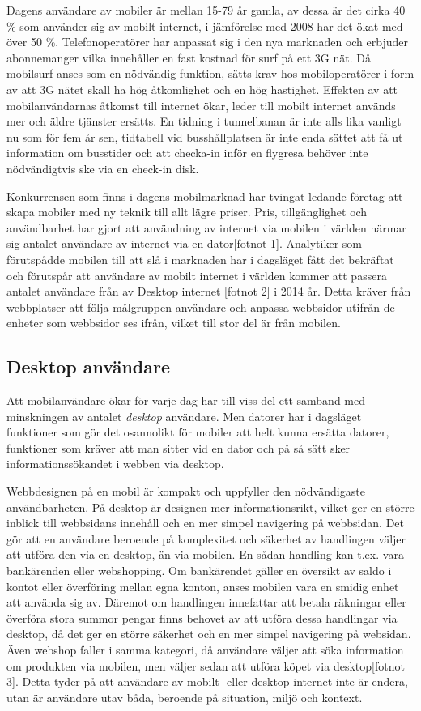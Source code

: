 \documentclass[11pt]{article}
\begin{document}
Dagens användare av mobiler är mellan 15-79 år gamla, av dessa är det cirka 40 \% som använder sig av mobilt internet, i jämförelse med 2008 har det ökat med över 50 \%. Telefonoperatörer har anpassat sig i den nya marknaden och erbjuder abonnemanger vilka innehåller en fast kostnad för surf på ett 3G nät. Då mobilsurf anses som en nödvändig funktion, sätts krav hos mobiloperatörer i form av att 3G nätet skall ha hög åtkomlighet och en hög hastighet. Effekten av att mobilanvändarnas åtkomst till internet ökar, leder till mobilt internet används mer och äldre tjänster ersätts. En tidning i tunnelbanan är inte alls lika vanligt nu som för fem år sen, tidtabell vid busshållplatsen är inte enda sättet att få ut information om busstider och att checka-in inför en flygresa behöver inte nödvändigtvis ske via en check-in disk.


Konkurrensen som finns i dagens mobilmarknad har tvingat ledande företag att skapa mobiler med ny teknik till allt lägre priser. Pris, tillgänglighet och användbarhet har gjort att användning av internet via mobilen i världen närmar sig antalet användare av internet via en dator[fotnot 1]. Analytiker som förutspådde mobilen till att slå i marknaden har i dagsläget fått det bekräftat och förutspår att användare av mobilt internet i världen kommer att passera antalet användare från av Desktop internet [fotnot 2] i 2014 år. Detta kräver från webbplatser att följa målgruppen användare och anpassa webbsidor utifrån de enheter som webbsidor ses ifrån, vilket till stor del är från mobilen.

\subsection{Desktop användare}
Att mobilanvändare ökar för varje dag har till viss del ett samband med minskningen av antalet \textit{desktop} användare. Men datorer har i dagsläget funktioner som gör det osannolikt för mobiler att helt kunna ersätta datorer, funktioner som kräver att man sitter vid en dator och på så sätt sker informationssökandet i webben via desktop. 

Webbdesignen på en mobil är kompakt och uppfyller den nödvändigaste användbarheten.
På desktop är designen mer informationsrikt, vilket ger en större inblick till webbsidans innehåll och en mer simpel navigering på webbsidan. Det gör att en användare beroende på komplexitet och säkerhet av handlingen väljer att utföra den via en desktop, än via mobilen. En sådan handling kan t.ex. vara bankärenden eller webshopping. Om bankärendet gäller en översikt av saldo i kontot eller överföring mellan egna konton, anses mobilen vara en smidig enhet att använda sig av. Däremot om handlingen innefattar att betala räkningar eller överföra stora summor pengar finns behovet av att utföra dessa handlingar via desktop, då det ger en större säkerhet och en mer simpel navigering på websidan. Även webshop faller i samma kategori, då användare väljer att söka information om produkten via mobilen, men väljer sedan att utföra köpet via desktop[fotnot 3]. Detta tyder på att användare av mobilt- eller desktop internet inte är endera, utan är användare utav båda, beroende på situation, miljö och kontext.
\end{document}
